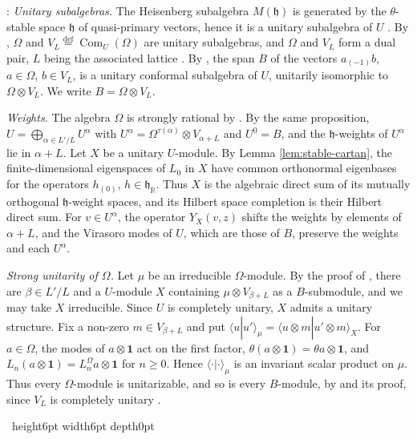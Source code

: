 \documentclass[leqno]{article}
\newcommand{\R}{\ensuremath{\mathbb{R}}}
\renewcommand{\geq}{\ensuremath{\geqslant}}
\newcommand{\qed}{\hfill \vrule height6pt  width6pt depth0pt}
\newcommand{\ot}{\otimes}
\newcommand{\ov}{\overset}
\newenvironment{proof}[1][]{\noindent {\it Proof #1} : }{\hbox{~}\qed
\smallskip
}
\numberwithin{equation}{section}
\begin{document}
\begin{proof}
\emph{Unitary subalgebras.} The Heisenberg subalgebra $M(\mathfrak h)$ is generated by the $\theta$-stable space $\mathfrak h$ of quasi-primary vectors, hence it is a unitary subalgebra of $U$ \cite[Example 5.26 p.~44]{CKLW18}. By \cite[Example 5.27 p.~44]{CKLW18}, $\Omega$ and $V_L \ov{\mathrm{def}}{=} \operatorname{Com}_U(\Omega)$ are unitary subalgebras, and $\Omega$ and $V_L$ form a dual pair, $L$ being the associated lattice \cite[Proposition 12.2]{Arh26}. By \cite[Proposition 2.21 p.~16]{Ten19g}, the span $B$ of the vectors $a_{(-1)}b$, $a \in \Omega$, $b \in V_L$, is a unitary conformal subalgebra of $U$, unitarily isomorphic to $\Omega \ot V_L$. We write $B = \Omega \ot V_L$.

\emph{Weights.} The algebra $\Omega$ is strongly rational by \cite[Proposition 12.2]{Arh26}. By the same proposition, $U = \bigoplus_{\alpha \in L'/L} U^\alpha$ with $U^\alpha = \Omega^{\tau(\alpha)} \ot V_{\alpha+L}$ and $U^0 = B$, and the $\mathfrak h$-weights of $U^\alpha$ lie in $\alpha+L$. Let $X$ be a unitary $U$-module. By Lemma \ref{lem:stable-cartan}, the finite-dimensional eigenspaces of $L_0$ in $X$ have common orthonormal eigenbases for the operators $h_{(0)}$, $h \in \mathfrak h_{\R}$. Thus $X$ is the algebraic direct sum of its mutually orthogonal $\mathfrak h$-weight spaces, and its Hilbert space completion is their Hilbert direct sum. For $v \in U^\alpha$, the operator $Y_X(v,z)$ shifts the weights by elements of $\alpha+L$, and the Virasoro modes of $U$, which are those of $B$, preserve the weights and each $U^\alpha$.

\emph{Strong unitarity of $\Omega$.} Let $\mu$ be an irreducible $\Omega$-module. By the proof of \cite[Proposition 12.2, part 2]{Arh26}, there are $\beta \in L'/L$ and a $U$-module $X$ containing $\mu \ot V_{\beta+L}$ as a $B$-submodule, and we may take $X$ irreducible. Since $U$ is completely unitary, $X$ admits a unitary structure. Fix a non-zero $m \in V_{\beta+L}$ and put $\langle u|u'\rangle_\mu = \langle u \ot m|u' \ot m\rangle_X$. For $a \in \Omega$, the modes of $a \ot \mathbf 1$ act on the first factor, $\theta(a \ot \mathbf 1) = \theta a \ot \mathbf 1$, and $L_n(a \ot \mathbf 1) = L^\Omega_na \ot \mathbf 1$ for $n \geq 0$. Hence $\langle \cdot|\cdot\rangle_\mu$ is an invariant scalar product on $\mu$. Thus every $\Omega$-module is unitarizable, and so is every $B$-module, by \cite[Proposition 3.31 p.~48]{Gui22} and its proof, since $V_L$ is completely unitary \cite[Corollary 3.32 p.~49]{Gui22}.


\end{proof}
\end{document}
